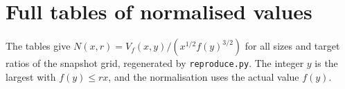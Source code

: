 \section{Full tables of normalised values}\label{app:tables}

The tables give $N(x,r)=V_f(x,y)/(x^{1/2}f(y)^{3/2})$ for all sizes and target ratios of the snapshot grid, regenerated by \texttt{reproduce.py}. The integer $y$ is the largest with $f(y)\le rx$, and the normalisation uses the actual value $f(y)$.

\begin{table}[ht]
\centering
\small

\caption{$f(k)=k^2+1$.}
\end{table}

\begin{table}[ht]
\centering
\small

\caption{$f(k)=k^3+2$.}
\end{table}

\begin{table}[ht]
\centering
\small

\caption{$f(k)=2k+1$.}
\end{table}
\clearpage
